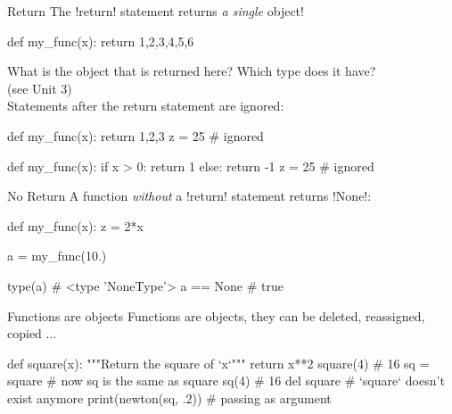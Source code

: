 \documentclass[hyperref={pdfpagelabels=false},table]{beamer}
\begin{document}
\begin{frame}[fragile]{Return}
The \pyth!return! statement returns \emph{a single} object!\\
\vfill
\begin{python}
def my_func(x):
    return 1,2,3,4,5,6
\end{python}
What is the object that is returned here? Which type does it have? \\
{\footnotesize (see Unit 3)}\\
\vfill
Statements after the return statement are ignored:\\[0.5cm]
\begin{minipage}[top]{0.4\textwidth}
\begin{python}
def my_func(x):
    return 1,2,3
    z = 25 # ignored
\end{python}
\end{minipage}
\hfill
\begin{minipage}[top]{0.4\textwidth}
\begin{python}
def my_func(x):
   if x > 0:
      return 1
   else:
      return -1
   z = 25 # ignored
\end{python}
\end{minipage}
\end{frame}
\begin{frame}[fragile]{No Return}
A function \emph{without} a \pyth!return! statement
returns \pyth!None!:\\
\vfill
\begin{python}
def my_func(x):
    z = 2*x

a = my_func(10.)

type(a) # <type 'NoneType'>
a == None # true
\end{python}
\vfill
\end{frame}
\begin{frame}[fragile]{Functions are objects}
Functions are objects, they can be deleted, reassigned, copied ... \\
\vfill
\begin{python}
def square(x):
  """Return the square of `x`"""
  return x**2
square(4) # 16
sq = square # now sq is the same as square
sq(4) # 16
del square # `square` doesn't exist anymore
print(newton(sq, .2)) # passing as argument
\end{python}
\end{frame}
\end{document}
